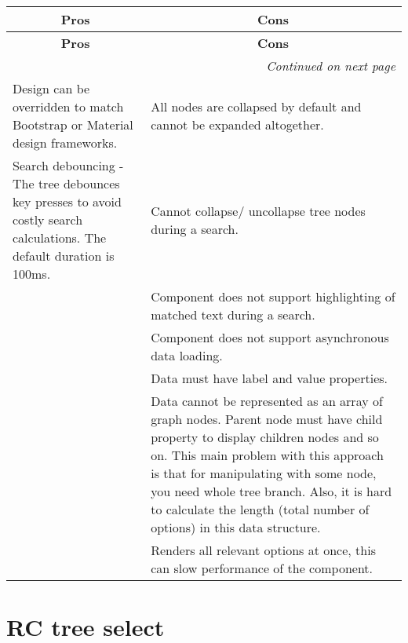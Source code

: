 \begin{center}
    \begin{longtable}{|p{7cm}|p{7cm}|}
      \hline 
      \multicolumn{1}{|c|}{\textbf{Pros}} & 
      \multicolumn{1}{c|}{\textbf{Cons}}
      \endfirsthead
      
      \multicolumn{2}{c}%
	{\tablename\ \thetable\ -- \textit{Continued from previous page}} \\
	\hline
	\multicolumn{1}{|c|}{\textbf{Pros}} & \multicolumn{1}{c|}{\textbf{Cons}} \\
    \endhead
    \multicolumn{2}{r}{\textit{Continued on next page}} \\
	\endfoot
    \hline
	\endlastfoot
    \hline
    
        Design can be overridden to match Bootstrap \parencite{bootstrap} or Material design \parencite{material_design} frameworks.
        & All nodes are collapsed by default and cannot be expanded altogether. \\
        \hline
        Search debouncing - The tree debounces key presses to avoid costly search calculations. The default duration is 100ms. 
        & Cannot collapse/ uncollapse tree nodes during a search. \\
        \hline
        & Component does not support highlighting of matched text during a search. \\
        \hline
        & Component does not support asynchronous data loading. \\
        \hline
        & Data must have label and value properties. \\
        \hline
        & Data cannot be represented as an array of graph nodes.  Parent node must have child property to display children nodes and so on. This main problem with this approach is that for manipulating with some node, you need whole tree branch. Also, it is hard to calculate the length (total number of options) in this data structure. \\
        \hline
        & Renders all relevant options at once, this can slow performance of the component. \\
        \hline
    \end{longtable}
\end{center}


\section{RC tree select}

